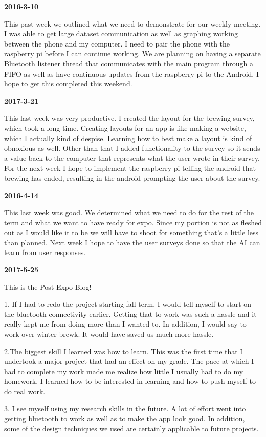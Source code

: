 \textbf{2016-3-10}

This past week we outlined what we need to demonstrate for our weekly meeting. I was able to get large dataset communication as well as graphing working between the phone and my computer. I need to pair the phone with the raspberry pi before I can continue working. We are planning on having a separate Bluetooth listener thread that communicates with the main program through a FIFO as well as have continuous updates from the raspberry pi to the Android. I hope to get this completed this weekend.

\textbf{2017-3-21}

This last week was very productive. I created the layout for the brewing survey, which took a long time. Creating layouts for an app is like making a website, which I actually kind of despise. Learning how to best make a layout is kind of obnoxious as well. Other than that I added functionality to the survey so it sends a value back to the computer that represents what the user wrote in their survey. For the next week I hope to implement the raspberry pi telling the android that brewing has ended, resulting in the android prompting the user about the survey.

\textbf{2016-4-14}

This last week was good. We determined what we need to do for the rest of the term and what we want to have ready for expo. Since my portion is not as fleshed out as I would like it to be we will have to shoot for something that's a little less than planned. Next week I hope to have the user surveys done so that the AI can learn from user responses.

\textbf{2017-5-25}

This is the Post-Expo Blog!

1. If I had to redo the project starting fall term, I would tell myself to start on the bluetooth connectivity earlier. Getting that to work was such a hassle and it really kept me from doing more than I wanted to. In addition, I would say to work over winter brewk. It would have saved us much more hassle.

2.The biggest skill I learned was how to learn. This was the first time that I undertook a major project that had an effect on my grade. The pace at which I had to complete my work made me realize how little I usually had to do my homework. I learned how to be interested in learning and how to push myself to do real work.

3. I see myself using my research skills in the future. A lot of effort went into getting bluetooth to work as well as to make the app look good. In addition, some of the design techniques we used are certainly applicable to future projects.


